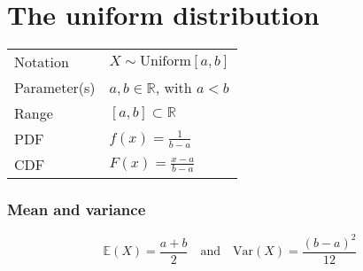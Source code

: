 \documentclass[lecture]{csm}
\newcommand{\expe}{\mathbb{E}}
\newcommand{\var}{\text{Var}}
\newcommand{\R}{\mathbb{R}}
\begin{document}
\maketitle
\tableofcontents

\section{The uniform distribution}
\begin{center}
\begin{tabular}{ll}\hline
Notation			& $X\sim\text{Uniform}[a,b]$ \\
Parameter(s)		& $a,b\in\R$, with $a<b$ \\
Range			& $[a,b]\subset\R$ \\
PDF				& $f(x) = \displaystyle\frac{1}{b-a}$ \\[2ex]
CDF				& $F(x) = \displaystyle\frac{x-a}{b-a}$ \\[2ex] \hline
\end{tabular}
\end{center}

\subsubsection*{Mean and variance}
\[
\expe(X) = \frac{a+b}{2} \quad\text{and}\quad \var(X) = \frac{(b-a)^2}{12}
\]

\newpage
\end{document}
